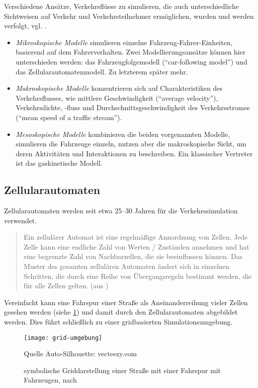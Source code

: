 Verschiedene Ansätze, Verkehrsflüsse zu simulieren, die auch unterschiedliche Sichtweisen auf Verkehr und Verkehrsteilnehmer ermöglichen, %
wurden und werden verfolgt, vgl. \cite{dingding}.
\begin{itemize}
	\item \textit{Mikroskopische Modelle} simulieren einzelne Fahrzeug-Fahrer-Einheiten, basierend auf dem Fahrerverhalten. Zwei Modellierungsansätze können hier unterschieden werden: das Fahrzeugfolgemodell (\enquote{car-following model}) und das Zellularautomatenmodell. Zu letzterem später mehr.
	\item \textit{Makroskopische Modelle}  konzentrieren sich auf Charakteristiken des Verkehrsflusses, wie mittlere Geschwindigkeit (\enquote{average velocity}), Verkehrsdichte, -fluss und Durchschnittsgeschwindigkeit des Verkehrsstromes (\enquote{mean speed of a traffic stream}).
	\item \textit{Mesoskopische Modelle} kombinieren die beiden vorgenannten Modelle, simulieren die Fahrzeuge einzeln, nutzen aber die makroskopische Sicht, um deren Aktivitäten und Interaktionen zu beschreiben. Ein klassischer Vertreter ist das gaskinetische Modell.
\end{itemize}



\subsection{Zellularautomaten}
\label{sec:ca}

Zellularautomaten werden seit etwa 25--30 Jahren für die Verkehrssimulation verwendet.

\begin{quote}
Ein zellulärer Automat ist eine regelmäßige Annordnung von Zellen. Jede Zelle kann eine endliche Zahl von Werten / Zuständen annehmen und hat eine  begrenzte Zahl von Nachbarzellen, die sie beeinflussen können. Das Muster des gesamten zellulären Automaten ändert sich in einzelnen Schritten, die durch eine Reihe von Übergangsregeln bestimmt werden, die für alle Zellen gelten. (aus \cite{cell-autom})
\end{quote} 

\noindent
Vereinfacht kann eine Fahrspur einer Straße als Aneinanderreihung vieler Zellen gesehen werden (siehe \cref{figure:grid-umgebung}) und damit durch den Zellularautomaten abgebildet werden. 
Dies führt schließlich zu einer gridbasierten Simulationsumgebung. 
\begin{figure}[hptb]
 \centering
 \texttt{[image: grid-umgebung]}
 \caption[Beispiel für die Griddarstellung einer Straße]
 		{symbolische Griddarstellung einer Straße mit einer Fahrspur mit Fahrzeugen, nach \cite{multi-lane}}
        {\footnotesize Quelle Auto-Silhouette: vecteezy.com}
 \label{figure:grid-umgebung}
\end{figure} 


